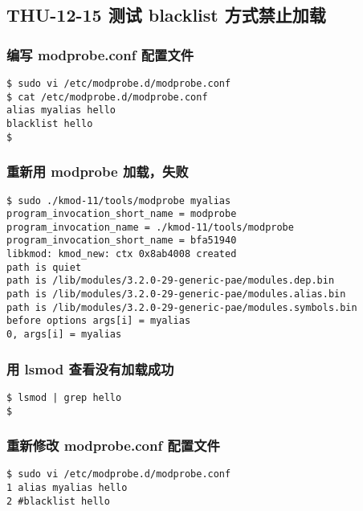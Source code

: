 \documentclass[11pt,a4paper]{article}
\begin{document}
\subsection{THU-12-15 测试 blacklist 方式禁止加载}

\subsubsection{编写 modprobe.conf 配置文件}

{\begin{shaded}\begin{verbatim}
$ sudo vi /etc/modprobe.d/modprobe.conf 
$ cat /etc/modprobe.d/modprobe.conf 
alias myalias hello
blacklist hello 
$ 
\end{verbatim}\end{shaded}}
\subsubsection{重新用 modprobe 加载，失败}

{\begin{shaded}\begin{verbatim}
$ sudo ./kmod-11/tools/modprobe myalias 
program_invocation_short_name = modprobe
program_invocation_name = ./kmod-11/tools/modprobe
program_invocation_short_name = bfa51940
libkmod: kmod_new: ctx 0x8ab4008 created
path is quiet
path is /lib/modules/3.2.0-29-generic-pae/modules.dep.bin
path is /lib/modules/3.2.0-29-generic-pae/modules.alias.bin
path is /lib/modules/3.2.0-29-generic-pae/modules.symbols.bin
before options args[i] = myalias
0, args[i] = myalias
\end{verbatim}\end{shaded}}
\subsubsection{用 lsmod 查看没有加载成功}

{\begin{shaded}\begin{verbatim}
$ lsmod | grep hello
$ 
\end{verbatim}\end{shaded}}
\subsubsection{重新修改 modprobe.conf 配置文件}

{\begin{shaded}\begin{verbatim}
$ sudo vi /etc/modprobe.d/modprobe.conf 
1 alias myalias hello
2 #blacklist hello 
\end{verbatim}\end{shaded}}
\end{document}

